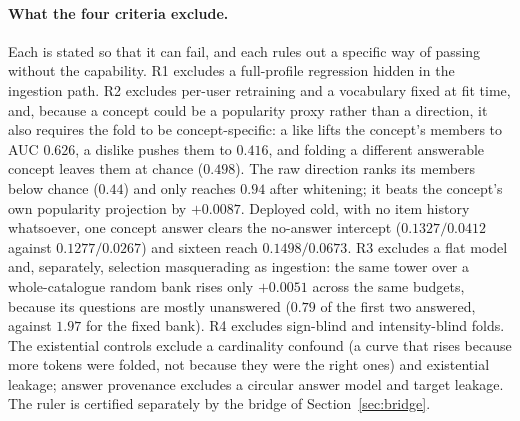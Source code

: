 \documentclass[acmsmall,review,anonymous]{acmart}
\begin{document}
\paragraph{What the four criteria exclude.} Each is stated so that it can fail, and each rules out a specific way of passing without the capability. R1 excludes a full-profile regression hidden in the ingestion path. R2 excludes per-user retraining and a vocabulary fixed at fit time, and, because a concept could be a popularity proxy rather than a direction, it also requires the fold to be concept-specific: a like lifts the concept's members to AUC $0.626$, a dislike pushes them to $0.416$, and folding a different answerable concept leaves them at chance ($0.498$). The raw direction ranks its members below chance ($0.44$) and only reaches $0.94$ after whitening; it beats the concept's own popularity projection by $+0.0087$. Deployed cold, with no item history whatsoever, one concept answer clears the no-answer intercept ($0.1327/0.0412$ against $0.1277/0.0267$) and sixteen reach $0.1498/0.0673$. R3 excludes a flat model and, separately, selection masquerading as ingestion: the same tower over a whole-catalogue random bank rises only $+0.0051$ across the same budgets, because its questions are mostly unanswered ($0.79$ of the first two answered, against $1.97$ for the fixed bank). R4 excludes sign-blind and intensity-blind folds. The existential controls exclude a cardinality confound (a curve that rises because more tokens were folded, not because they were the right ones) and existential leakage; answer provenance excludes a circular answer model and target leakage. The ruler is certified separately by the bridge of Section~\ref{sec:bridge}.
\end{document}
